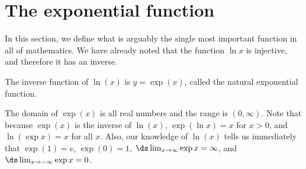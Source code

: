 \section{The exponential function}{}{}

In this section, we define what is arguably the single most
important function in all of mathematics.
 We have already noted that the
function $\ln x $ is injective, and therefore it has an inverse.

\begin{definition} The inverse function
of $\ln(x) $ is
$y=\exp(x)$, called the {\dfont natural exponential function}.
\end{definition}

The domain of $\exp(x) $ is all real numbers and the range is $(0,
\infty)$.  Note that because $\exp(x)$ is the inverse of $\ln(x)$,
$\exp (\ln x) =x$ for $x>0$, and 
$\ln (\exp x) = x$ for all $x$.
Also, our knowledge of $\ln(x)$ tells us immediately that
$\exp(1) = e$, $\exp(0) = 1$, $\ds\lim _{x\to\infty} \exp x =\infty$, and
$\ds\lim_{x\to -\infty } \exp x = 0$.

